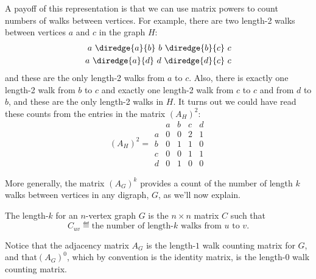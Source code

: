 A payoff of this representation is that we can use matrix powers to
count numbers of walks between vertices.  For example, there are two
length-2 walks between vertices $a$ and $c$ in the graph $H$:
\begin{align*}
a\ \diredge{a}{b}\ b\ \diredge{b}{c}\  c\\
a\ \diredge{a}{d}\ d\ \diredge{d}{c}\ c
\end{align*}
and these are the only length-2 walks from $a$ to $c$.  Also, there is
exactly one length-2 walk from $b$ to $c$ and exactly one length-2
walk from $c$ to $c$ and from $d$ to $b$, and these are the only
length-2 walks in $H$.  It turns out we could have read these counts
from the entries in the matrix $(A_H)^2$:
\[
(A_H)^2 = \begin{array}{c|cccc|}
  &  a & b & c & d \\ \hline
a &  0 & 0 & 2 & 1 \\
b &  0 & 1 & 1 & 0 \\
c &  0 & 0 & 1 & 1 \\
d &  0 & 1 & 0 & 0
\end{array}
\]

\iffalse
If $G$ is a weighted graph with edge weights given by $w: E \to
\reals$, then the adjacency matrix for~$G$ is $A_G = \{ a_{ij} \}$
where
\begin{equation*}
    a_{ij} = \begin{cases}
                w(\edge{v_i}{v_j}) & \text{if $\edge{v_i}{v_j} \in E$} \\
                0                 & \text{otherwise.}
              \end{cases}
\end{equation*}
\end{definition}

For example, Figure~\ref{fig:adjacency_matrix} displays the adjacency
matrices for the graphs shown in Figures~\ref{fig:isomorphism}(a)
and~\ref{fig:weighted_graph} where $v_1 = a$, $v_2 = b$, $v_3 = c$,
and $v_4 = d$.
\fi

More generally, the matrix $(A_G)^k$ provides a count of the number of
length $k$ walks between vertices in any digraph, $G$, as we'll now
explain.

\begin{definition}
  The length-$k$  for an $n$-vertex graph $G$
  is the $n \times n$ matrix $C$ such that
\begin{equation}\label{def:walk_matrix}
C_{uv} \eqdef \text{the number of length-$k$ walks from $u$ to $v$}.
\end{equation}
\end{definition}
Notice that the adjacency matrix $A_G$ is the length-$1$ walk counting
matrix for $G$, and that$(A_G)^0$, which by convention is the identity
matrix, is the length-0 walk counting matrix.

